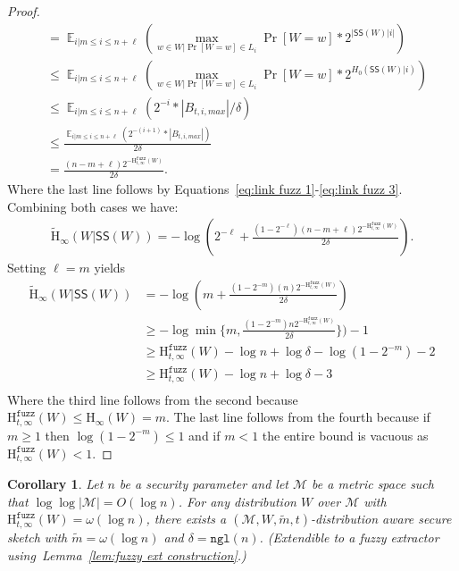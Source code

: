 \documentclass[11pt]{article}
\newcommand{\lemref}[1]{\mbox{Lemma~\ref{#1}}}
\DeclareMathOperator*{\expe}{\mathbb{E}}
\newcommand{\class}[1]{{\ensuremath{\mathsf{#1}}}}
\newcommand{\sketch}{\ensuremath{\class{SS}}\xspace}
\newcommand{\ngl}{\ensuremath{\mathtt{ngl}}\xspace}
\newcommand{\Hoo}{\mathrm{H}_\infty}
\newcommand{\Hav}{\tilde{\mathrm{H}}_\infty}
\newcommand{\Hfuzz}{\mathrm{H}^{\mathtt{fuzz}}_{t,\infty}}
\newtheorem{corollary}[theorem]{Corollary}
\begin{document}
\begin{proof}
\begin{align*}
&= \expe_{i | m\le i \le n+\ell} \left(\max_{w\in W | \Pr[W=w]\in L_i} \Pr[W=w]*2^{|\sketch(W)|i|}\right)\\
&\le \expe_{i | m\le i \le n+\ell} \left(\max_{w\in W | \Pr[W=w]\in L_i} \Pr[W=w]*2^{H_0(\sketch(W) | i)}\right)\\
&\le \expe_{i | m\le i \le n+\ell} \left(2^{-i}*|B_{t, i, max}|/\delta\right)\\
&\le\frac{ \expe_{i | m\le i \le n+\ell} \left(2^{-(i+1)}*|B_{t, i, max}|\right)}{2\delta}\\
&= \frac{(n-m+\ell) 2^{-\Hfuzz(W)}}{2\delta}.
\end{align*}
Where the last line follows by Equations~\eqref{eq:link fuzz 1}-\eqref{eq:link fuzz 3}.
Combining both cases we have:
\begin{align*}
\Hav(W | \sketch(W)) = -\log \left(2^{-\ell}+\frac{(1-2^{-\ell})(n-m+\ell)2^{-\Hfuzz(W)}}{2\delta}\right).
\end{align*}
Setting $\ell = m$ yields
\begin{align*}
\Hav(W | \sketch(W)) &= -\log \left(m+\frac{(1-2^{-m})(n)2^{-\Hfuzz(W)}}{2\delta}\right)\\
&\ge -\log \min\{m, \frac{(1-2^{-m}) n2^{-\Hfuzz(W)}}{2\delta}\})-1\\
&\ge \Hfuzz(W) - \log n + \log \delta - \log (1-2^{-m}) - 2\\
&\ge \Hfuzz(W) - \log n + \log \delta - 3\\
\end{align*}
Where the third line follows from the second because $\Hfuzz(W)\le \Hoo(W) = m$. The last line follows from the fourth because if $m\ge 1$ then $\log (1-2^{-m})\le 1$ and if $m< 1$ the entire bound is vacuous as $\Hfuzz(W)< 1$.
\end{proof}

\begin{corollary}
\label{cor:extension to fuzz ext}
Let $n$ be a security parameter and let $\mathcal{M}$ be a metric space such that $\log \log |\mathcal{M}| = O(\log n)$.
For any distribution $W$ over $\mathcal{M}$ with $\Hfuzz(W)=\omega(\log n)$, there exists a $(\mathcal{M}, W, \tilde{m}, t)$-distribution aware secure sketch with $\tilde{m} = \omega(\log n)$ and $\delta = \ngl(n)$.  (Extendible to a fuzzy extractor using~\lemref{lem:fuzzy ext construction}.)
\end{corollary}
\end{document}

